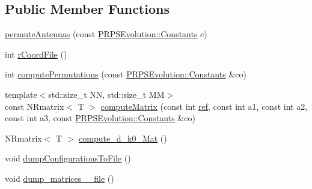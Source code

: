 \subsection*{\-Public \-Member \-Functions}
\begin{DoxyCompactItemize}
\item 
\hyperlink{struct_p_r_p_s_evolution_1_1_permutate_1_1permute_antennas_a68fefa5568ab6e69f07e70e9c14645f7}{permute\-Antennas} (const \hyperlink{struct_p_r_p_s_evolution_1_1_constants}{\-P\-R\-P\-S\-Evolution\-::\-Constants} c)
\item 
int \hyperlink{struct_p_r_p_s_evolution_1_1_permutate_1_1permute_antennas_a0047bdfca507e76d1e19b9303d295fa0}{r\-Coord\-File} ()
\item 
int \hyperlink{struct_p_r_p_s_evolution_1_1_permutate_1_1permute_antennas_a440bc6e938ae87959dc4453637246cb6}{compute\-Permutations} (const \hyperlink{struct_p_r_p_s_evolution_1_1_constants}{\-P\-R\-P\-S\-Evolution\-::\-Constants} \&co)
\item 
{\footnotesize template$<$std\-::size\-\_\-t \-N\-N, std\-::size\-\_\-t \-M\-M$>$ }\\const \-N\-Rmatrix$<$ \-T $>$ \hyperlink{struct_p_r_p_s_evolution_1_1_permutate_1_1permute_antennas_a74e6a08269a63447819fc57b06550f27}{compute\-Matrix} (const int \hyperlink{struct_p_r_p_s_evolution_1_1_permutate_1_1permute_antennas_a21e29b21d0c2cc612a06857da0127621}{ref}, const int a1, const int a2, const int a3, const \hyperlink{struct_p_r_p_s_evolution_1_1_constants}{\-P\-R\-P\-S\-Evolution\-::\-Constants} \&co)
\item 
\-N\-Rmatrix$<$ \-T $>$ \hyperlink{struct_p_r_p_s_evolution_1_1_permutate_1_1permute_antennas_a23dacd34ff43f2a382e2feab2b7c25ad}{compute\-\_\-d\-\_\-k0\-\_\-\-Mat} ()
\item 
void \hyperlink{struct_p_r_p_s_evolution_1_1_permutate_1_1permute_antennas_a978cc54f7590fbf3c703eb27151e2868}{dump\-Configurations\-To\-File} ()
\item 
void \hyperlink{struct_p_r_p_s_evolution_1_1_permutate_1_1permute_antennas_a4b9b2a07d7ecf49fd901c9df1a811af6}{dump\-\_\-matrices\-\_\-\_\-file} ()
\end{DoxyCompactItemize}
